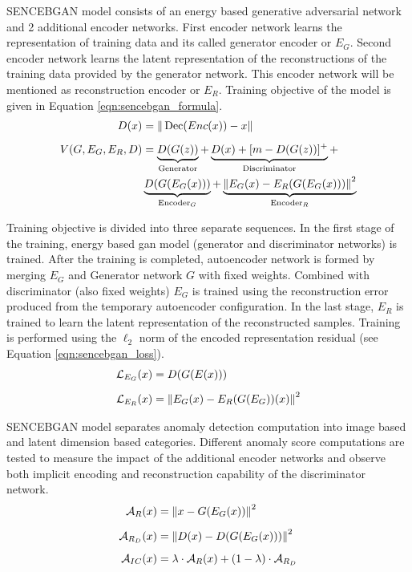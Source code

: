 SENCEBGAN model consists of an energy based generative adversarial network and 2 additional encoder
networks. First encoder network learns the representation of training data and its called
generator encoder or $E_{G}$. Second encoder network learns the latent representation of the reconstructions
of the training data provided by the generator network. This encoder network will be mentioned as
reconstruction encoder or $E_{R}$. Training objective of the model is given in Equation
\ref{eqn:sencebgan_formula}.
\begin{equation}
	\begin{aligned}
		D(x)&=\|\operatorname{Dec}(E n c(x))-x\|\\[5pt]
		V(G,E_{G},E_{R}, D) &= \underbrace{D(G(z))}_{\text{Generator}} + \underbrace{D(x)+[m-D(G(z))]^{+}}_{\text{Discriminator}} +\\ & \underbrace{D(G(E_{G}(x)))}_{\text{Encoder}_{G}} + \underbrace{\left\lVert E_{G}(x) - E_{R}(G(E_{G}(x)))\right\rVert^2}_{\text{Encoder}_{R}}
	\end{aligned}
	\label{eqn:sencebgan_formula}
\end{equation}

Training objective is divided into three separate sequences. In the first stage of the training,
energy based gan model (generator and discriminator networks) is trained. After the training 
is completed, autoencoder network is formed by merging $E_{G}$ and Generator network $G$ with fixed weights. 
Combined with discriminator (also fixed weights) $E_{G}$ is trained using the reconstruction 
error produced from the temporary autoencoder configuration. In the last stage, $E_{R}$ is 
trained to learn the latent representation of the reconstructed samples. Training is performed 
using the $\ell_{2}$ norm of the encoded representation residual (see Equation \ref{eqn:sencebgan_loss}). 
\begin{equation}
	\label{eqn:sencebgan_loss}
	\begin{aligned}
		\mathcal{L}_{E_{G}}(x) &= D(G(E(x))) \\[5pt]
		\mathcal{L}_{E_{R}}(x) &= \left\lVert E_{G}(x) - E_{R}(G(E_{G}))(x)\right\rVert^2
 	\end{aligned}
\end{equation}

SENCEBGAN model separates anomaly detection computation into image based and latent dimension based
categories. Different anomaly score computations are tested to measure the impact of the additional
encoder networks and observe both implicit encoding and reconstruction capability of the
discriminator network. 
\begin{equation}
	\label{eqn:sencebgan_eqn_im}
	\begin{aligned}
	\mathcal{A}_{R}(x) & = \left\lVert x - G(E_{G}(x))\right\rVert^ 2 \\[5pt]
	\mathcal{A}_{R_{D}}(x) & = \left\lVert D(x) - D(G(E_{G}(x)))\right\rVert^2\\[5pt]
	\mathcal{A}_{IC}(x) & = \lambda \cdot \mathcal{A}_{R}(x) + (1 - \lambda) \cdot \mathcal{A}_{R_{D}}
	\end{aligned}
\end{equation}

